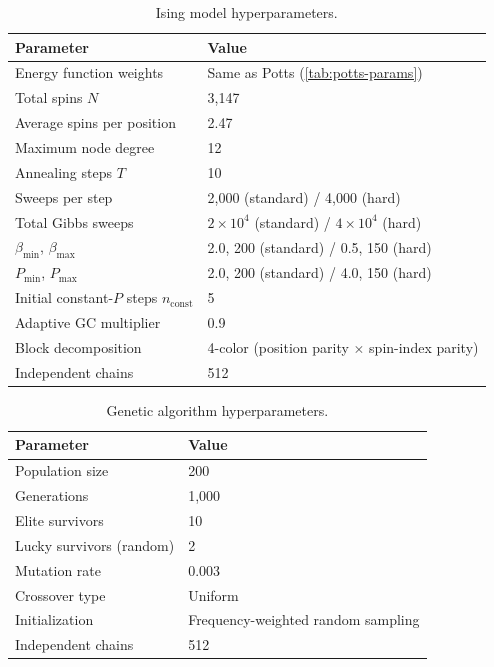 \documentclass[11pt]{article}
\begin{document}
\begin{table}[H]
\centering
\caption{Ising model hyperparameters.}
\label{tab:ising-params}
\vspace{2mm}
\begin{tabular}{ll}
\toprule
Parameter & Value \\
\midrule
Energy function weights & Same as Potts (\cref{tab:potts-params}) \\
Total spins $N$ & 3{,}147 \\
Average spins per position & 2.47 \\
Maximum node degree & 12 \\
Annealing steps $T$ & 10 \\
Sweeps per step & 2{,}000 (standard) / 4{,}000 (hard) \\
Total Gibbs sweeps & $2 \times 10^4$ (standard) / $4 \times 10^4$ (hard) \\
$\beta_{\mathrm{min}}$, $\beta_{\mathrm{max}}$ & 2.0, 200 (standard) / 0.5, 150 (hard) \\
$P_{\mathrm{min}}$, $P_{\mathrm{max}}$ & 2.0, 200 (standard) / 4.0, 150 (hard) \\
Initial constant-$P$ steps $n_{\mathrm{const}}$ & 5 \\
Adaptive GC multiplier & 0.9 \\
Block decomposition & 4-color (position parity $\times$ spin-index parity) \\
Independent chains & 512 \\
\bottomrule
\end{tabular}
\end{table}

\begin{table}[H]
\centering
\caption{Genetic algorithm hyperparameters.}
\label{tab:ga-params}
\vspace{2mm}
\begin{tabular}{ll}
\toprule
Parameter & Value \\
\midrule
Population size & 200 \\
Generations & 1{,}000 \\
Elite survivors & 10 \\
Lucky survivors (random) & 2 \\
Mutation rate & 0.003 \\
Crossover type & Uniform \\
Initialization & Frequency-weighted random sampling \\
Independent chains & 512 \\
\bottomrule
\end{tabular}
\end{table}
\end{document}
